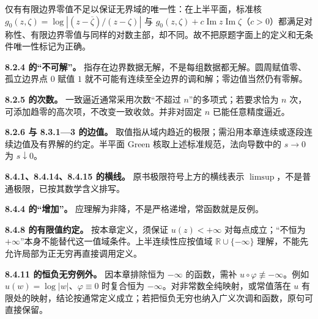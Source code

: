 \documentclass[11pt,a4paper]{article}
\begin{document}
仅有有限边界零值不足以保证无界域的唯一性：在上半平面，标准核
\(g_0(z,\zeta)=\log\left|(z-\overline\zeta)/(z-\zeta)\right|\) 与
\(g_0(z,\zeta)+c\operatorname{Im}z\operatorname{Im}\zeta\)（\(c>0\)）都满足对称性、有限边界零值与同样的对数主部，却不同。故不把原题字面上的定义和无条件唯一性标记为正确。

\textbf{8.2.4 的``不可解''。}
指存在边界数据无解，不是每组数据都无解。圆周赋值零、孤立边界点 \(0\)
赋值 \(1\) 就不可能有连续至全边界的调和解；零边值当然仍有零解。

\textbf{8.2.5 的次数。} 一致逼近通常采用次数``不超过
\(n\)''的多项式；若要求恰为 \(n\)
次，可添加趋零的高次项，不改变一致收敛。并非对固定 \(n\)
已能任意精度逼近。

\textbf{8.2.6 与 8.3.1---3 的边值。}
取值指从域内趋近的极限；需沿用本章连续或逐段连续边值及有界解的约定。半平面
Green 核取上述标准规范，法向导数中的 \(s\to0\) 为 \(s\downarrow0\)。

\textbf{8.4.1、8.4.14、8.4.15 的横线。} 原书极限符号上方的横线表示
\(\limsup\)，不是普通极限，已按其数学含义排写。

\textbf{8.4.4 的``增加''。} 应理解为非降，不是严格递增，常函数就是反例。

\textbf{8.4.8 的有限值约定。} 按本章定义，须保证 \(u(z)<+\infty\)
对每点成立；``不恒为
\(+\infty\)''本身不能替代这一值域条件。上半连续性应按值域
\(\mathbb R\cup\{-\infty\}\)
理解，不能先允许局部为正无穷再直接调用定义。

\textbf{8.4.11 的恒负无穷例外。} 因本章排除恒为 \(-\infty\) 的函数，需补
\(u\circ\varphi\not\equiv-\infty\)。例如
\(u(w)=\log|w|\)、\(\varphi\equiv0\) 时复合恒为
\(-\infty\)。对非常数全纯映射，或常值落在 \(u\)
有限处的映射，结论按通常定义成立；若把恒负无穷也纳入广义次调和函数，原句可直接保留。
\end{document}
